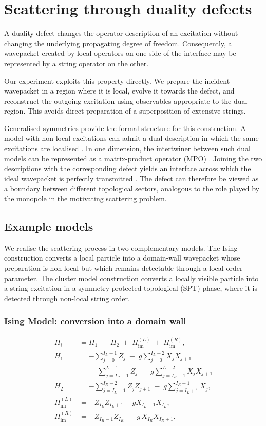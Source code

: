 \documentclass[aps,floatfix,10pt,amssymb,amsfont,amsmath,superscriptaddress,float,nofootinbib,longbibliography,nobalancelastpage,twocolumn]{revtex4-2}
\begin{document}
\section{Scattering through duality defects}
\label{section:nonlocalwavepacket}
A duality defect changes the operator description of an excitation without changing the underlying propagating degree of freedom. Consequently, a wavepacket created by local operators on one side of the interface may be represented by a string operator on the other. 

Our experiment exploits this property directly. We prepare the incident wavepacket in a region where it is local, evolve it towards the defect, and reconstruct the outgoing excitation using observables appropriate to the dual region. This avoids direct preparation of a superposition of extensive strings.

Generalised symmetries provide the formal structure for this construction. A model with non-local excitations can admit a dual description in which the same excitations are localised \cite{}. In one dimension, the intertwiner between such dual models can be represented as a matrix-product operator (MPO) \cite{lootens2023dualities, lootens2024dualities}. Joining the two descriptions with the corresponding defect yields an interface across which the ideal wavepacket is perfectly transmitted \cite{ueda2026perfect, ueda2026emergent}. The defect can therefore be viewed as a boundary between different topological sectors, analogous to the role played by the monopole in the motivating scattering problem.

\subsection{Example models}
We realise the scattering process in two complementary models. The Ising construction converts a local particle into a domain-wall wavepacket whose preparation is non-local but which remains detectable through a local order parameter. The cluster model construction converts a locally visible particle into a string excitation in a symmetry-protected topological (SPT) phase, where it is detected through non-local string order.

\subsubsection{Ising Model: conversion into a domain wall}
\begin{align*}
H_{i} &= H_1 \;+\; H_2 \;+\; H_{\mathrm{im}}^{(L)} \;+\; H_{\mathrm{im}}^{(R)}, \\[6pt]
H_1
&= -\sum_{j=0}^{I_L-1} Z_j
\;-\; g \sum_{j=0}^{I_L-2} X_j X_{j+1} \\[4pt]
&\quad -\; \sum_{j=I_R+1}^{L-1} Z_j
\;-\; g \sum_{j=I_R+1}^{L-2} X_j X_{j+1}\\
%
H_2
&= -\sum_{j=I_L+1}^{I_R-2} Z_j Z_{j+1}
\;-\; g \sum_{j=I_L+1}^{I_R-1} X_j, \\[8pt]
%
H_{\mathrm{im}}^{(L)}
&= - Z_{I_L} Z_{I_L+1}-g X_{I_L-1} X_{I_L}, \\[6pt]
%
H_{\mathrm{im}}^{(R)}
&= - Z_{I_R-1} Z_{I_R}
\;-\; g\, X_{I_R} X_{I_R+1}.
\end{align*}
\end{document}
